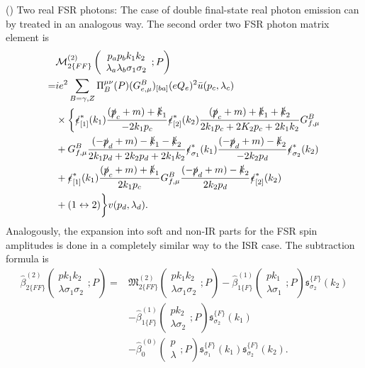 () Two real FSR photons:
The case of double final-state real photon emission can by treated in an analogous way. The second order two FSR photon matrix element is
\begin{align}
&\mathcal{M}^{(2)}_{2\{FF\}}\left(\begin{array}{c}
p_ap_bk_1k_2\\\lambda_a\lambda_b\sigma_1\sigma_2
\end{array};P\right)\nonumber\\
=&ie^2\sum_{B=\gamma,Z}\Pi_B^{\mu\nu}(P)(G^B_{e,\mu})_{[ba]}(eQ_e)^2\bar{u}(p_c,\lambda_c)\nonumber\\
&\times\biggl\{ \slashed \epsilon^\ast_{[1]}(k_1)\frac{(\slashed p_c+m)+\slashed k_1}{-2k_1p_c}\slashed\epsilon^\ast_{[2]}(k_2)\frac{(\slashed p_c+m)+\slashed k_1+\slashed k_2}{2k_1p_c+2K_2p_c+2k_1k_2} G^B_{f,\mu}\nonumber\\
& +G^B_{f,\mu}\frac{(-\slashed p_d+m)-\slashed k_1-\slashed k_2}{2k_1p_d+2k_2p_d+2k_1k_2}\slashed \epsilon^\ast_{\sigma_1}(k_1) \frac{(-\slashed p_d+m)-\slashed k_2}{-2k_2p_d}\slashed\epsilon^\ast_{\sigma_2}(k_2)\nonumber\\
&+ \slashed \epsilon^\ast_{[1]}(k_1)\frac{(\slashed p_c+m)+\slashed k_1}{2k_1p_c}G^B_{f,\mu}\frac{(-\slashed p_d+m)-\slashed k_2}{2k_2p_d} \slashed\epsilon^\ast_{[2]}(k_2)\nonumber\\
&+(1\leftrightarrow 2)\biggr\}v(p_d,\lambda_d).
\end{align}
Analogously, the expansion into soft and non-IR parts for the FSR spin amplitudes is done in a completely similar way to the ISR case. The subtraction formula is 
\begin{align}
\hat{\beta}^{(2)}_{2\{FF\}}\left(\begin{array}{c}
pk_1k_2\\\lambda\sigma_1\sigma_2
\end{array};P\right)
=&\mathfrak{M}^{(2)}_{2\{FF\}}\left(\begin{array}{c}
pk_1k_2\\\lambda\sigma_1\sigma_2
\end{array};P\right)-\hat{\beta}^{(1)}_{1\{F\}}\left(\begin{array}{c}
pk_1\\\lambda\sigma_1
\end{array};P\right)\mathfrak{s}^{\{F\}}_{\sigma_2}(k_2)\nonumber\\
&-\hat{\beta}^{(1)}_{1\{F\}}\left(\begin{array}{c}
pk_2\\\lambda\sigma_2
\end{array};P\right)\mathfrak{s}^{\{F\}}_{\sigma_2}(k_1)\nonumber\\
&-\hat{\beta}^{(0)}_{0}\left(\begin{array}{c}
p\\\lambda
\end{array};P\right)\mathfrak{s}^{\{F\}}_{\sigma_1}(k_1)\mathfrak{s}^{\{F\}}_{\sigma_2}(k_2).
\end{align}

